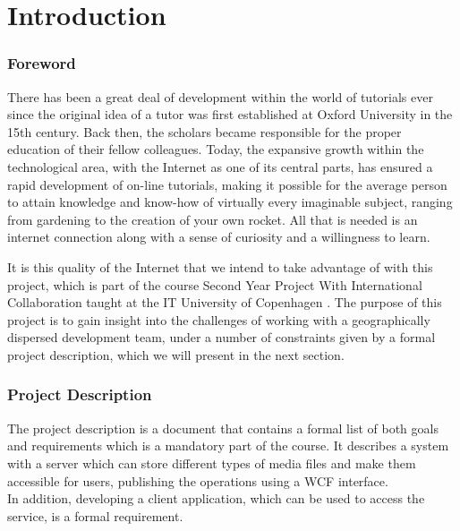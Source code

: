 \part{Introduction}
\section{Foreword}
There has been a great deal of development within the world of tutorials ever since the original idea of a tutor was first established at Oxford University in the 15th century. Back then, the scholars became responsible for the proper education of their fellow colleagues. Today, the expansive growth within the technological area, with the Internet as one of its central parts, has ensured a rapid development of on-line tutorials, making it possible for the average person to attain knowledge and know-how of virtually every imaginable subject, ranging from gardening to the creation of your own rocket. All that is needed is an internet connection along with a sense of curiosity and a willingness to learn. 

It is this quality of the Internet that we intend to take advantage of with this  project, which is part of the course Second Year Project With International Collaboration taught at the IT University of Copenhagen . The purpose of this project is to gain insight into the challenges of working with a geographically dispersed development team, under a number of constraints given by a formal project description, which we will present in the next section.


\section{Project Description}
The project description is a document that contains a formal list of both goals and requirements which is a mandatory part of the course. It describes a system with a server which can store different types of media files and make them accessible for users, publishing the operations using a WCF interface.\\
In addition, developing a client application, which can be used to access the service, is a formal requirement.

